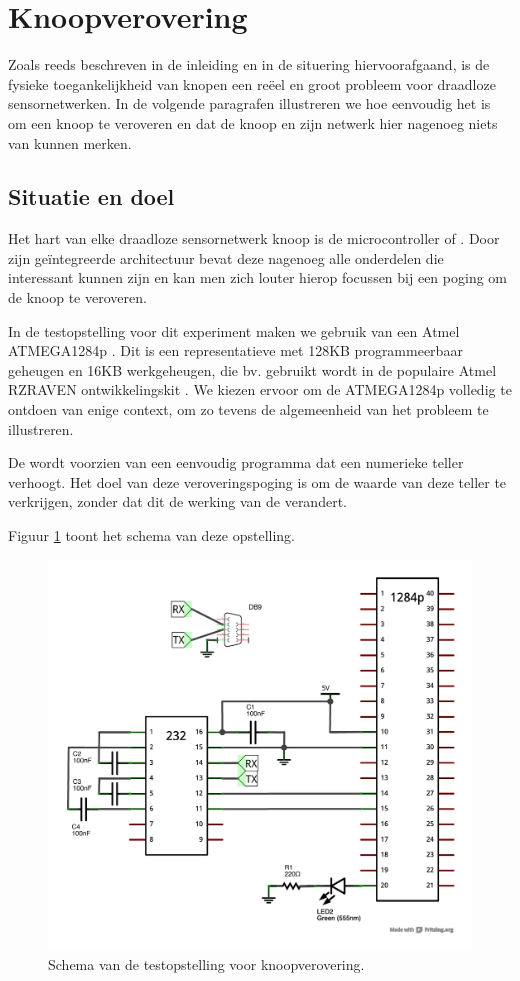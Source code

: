 
\section{Knoopverovering}
\label{section:node-capture}

Zoals reeds beschreven in de inleiding en in de situering hiervoorafgaand, is
de fysieke toegankelijkheid van knopen een re\"eel en groot probleem voor
draadloze sensornetwerken. In de volgende paragrafen illustreren we hoe
eenvoudig het is om een knoop te veroveren en dat de knoop en zijn netwerk hier
nagenoeg niets van kunnen merken.

\subsection{Situatie en doel}

Het hart van elke draadloze sensornetwerk knoop is de microcontroller of \mcu.
Door zijn ge\"integreerde architectuur bevat deze nagenoeg alle onderdelen die
interessant kunnen zijn en kan men zich louter hierop focussen bij een poging
om de knoop te veroveren.

In de testopstelling voor dit experiment maken we gebruik van een Atmel
ATMEGA1284p \cite{datasheet:atmega1284p}. Dit is een representatieve \mcu met
128KB programmeerbaar geheugen en 16KB werkgeheugen, die bv. gebruikt wordt in
de populaire Atmel RZRAVEN ontwikkelingskit \cite{manual:rzraven}. We kiezen
ervoor om de ATMEGA1284p volledig te ontdoen van enige context, om zo tevens de
algemeenheid van het probleem te illustreren.

De \mcu wordt voorzien van een eenvoudig programma dat een numerieke teller
verhoogt. Het doel van deze veroveringspoging is om de waarde van deze teller
te verkrijgen, zonder dat dit de werking van de \mcu verandert.

Figuur \ref{fig:node-capture-schematic} toont het schema van deze opstelling.

\begin{figure}[ht]
  \centering
  \includegraphics[width=0.7\linewidth]{resources/node-capture-schematic.pdf}
  \caption{Schema van de testopstelling voor knoopverovering.}
  \label{fig:node-capture-schematic}
\end{figure}

